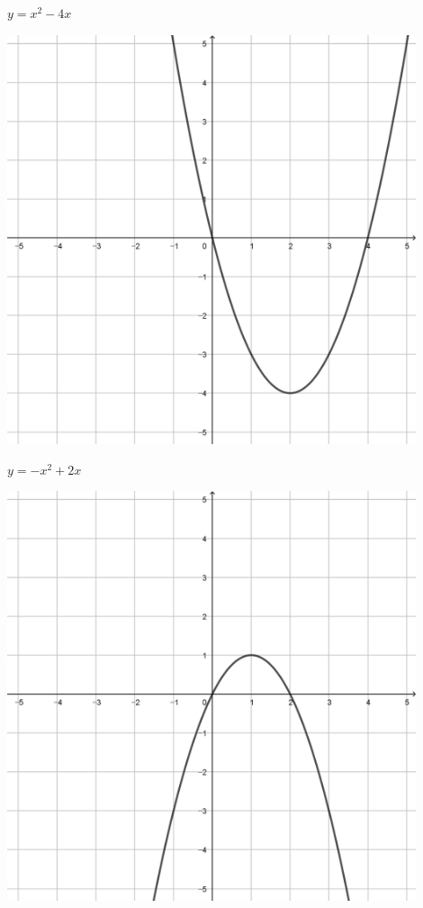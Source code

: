 \documentclass[a4paper]{oblivoir}
\begin{document}
\begin{minipage}{0.45\textwidth}\centering
\(y=x^2-4x\)
\par\bigskip\includegraphics[width=0.9\textwidth]{img/11-3}
\end{minipage}
\begin{minipage}{0.45\textwidth}\centering
\(y=-x^2+2x\)
\par\bigskip\includegraphics[width=0.9\textwidth]{img/11-4}
\end{minipage}\bigskip\bigskip\par
\end{document}
